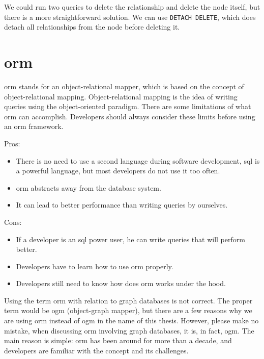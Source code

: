 We could run two queries to delete the relationship and delete the node itself, but there is a more straightforward solution.
We can use \texttt{DETACH DELETE}, which does detach all relationships from the node before deleting it.

\section{\acrshort{orm}}
\acrshort{orm} stands for an object-relational mapper, which is based on the concept of object-relational mapping.
Object-relational mapping is the idea of writing queries using the object-oriented paradigm.
There are some limitations of what \acrshort{orm} can accomplish. Developers should always consider these limits before using an \acrshort{orm} framework. \cite{mario_hoyos_what_2018}

\noindent Pros:
\begin{itemize}
    \item There is no need to use a second language during software development, \acrshort{sql} is a powerful language, but most developers do not use it too often.
    \item \acrshort{orm} abstracts away from the database system.
    \item It can lead to better performance than writing queries by ourselves.
\end{itemize}
Cons:
\begin{itemize}
    \item If a developer is an \acrshort{sql} power user, he can write queries that will perform better.
    \item Developers have to learn how to use \acrshort{orm} properly.
    \item Developers still need to know how does \acrshort{orm} works under the hood.
\end{itemize}

Using the term \acrshort{orm} with relation to graph databases is not correct. The proper term would be \acrshort{ogm} (object-graph mapper),
but there are a few reasons why we are using \acrshort{orm} instead of \acrshort{ogm} in the name of this thesis. However, please make no mistake,
when discussing \acrshort{orm} involving graph databases, it is, in fact, \acrshort{ogm}.
The main reason is simple: \acrshort{orm} has been around for more than a decade, and developers are familiar with the concept and its challenges.

